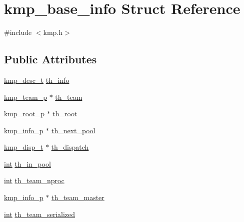 \hypertarget{structkmp__base__info}{\section{kmp\-\_\-base\-\_\-info Struct Reference}
\label{structkmp__base__info}
}


{\ttfamily \#include $<$kmp.\-h$>$}

\subsection*{Public Attributes}
\begin{DoxyCompactItemize}
\item 
\hyperlink{kmp_8h_a0b10af61096e1bac18cf4fc6acae5708}{kmp\-\_\-desc\-\_\-t} \hyperlink{structkmp__base__info_a922712159f3ad59ee5d79a182151f21b}{th\-\_\-info}
\item 
\hyperlink{kmp_8h_a2d72bf7a856130c6d2324db6367179a8}{kmp\-\_\-team\-\_\-p} $\ast$ \hyperlink{structkmp__base__info_a96385010dd060b2daec2310a7ddbe03e}{th\-\_\-team}
\item 
\hyperlink{kmp_8h_a511bcf1063f449060871e44de91e72f9}{kmp\-\_\-root\-\_\-p} $\ast$ \hyperlink{structkmp__base__info_ab24ae3c86062b1007b6403d0673f0401}{th\-\_\-root}
\item 
\hyperlink{kmp_8h_ac18028528c26006f57fea477167d447e}{kmp\-\_\-info\-\_\-p} $\ast$ \hyperlink{structkmp__base__info_a39a9989f4fd9476ef0868aeff1d5c003}{th\-\_\-next\-\_\-pool}
\item 
\hyperlink{kmp_8h_a125b055d611c51e55aa0b0819c1a5f33}{kmp\-\_\-disp\-\_\-t} $\ast$ \hyperlink{structkmp__base__info_a0b55c692c13be110491c23a0085f6730}{th\-\_\-dispatch}
\item 
\hyperlink{ittnotify__static_8h_a8b8dcd723308a8cb5d84277c7a3fff70}{int} \hyperlink{structkmp__base__info_abc2b3156a7154e8343a8784eeb505636}{th\-\_\-in\-\_\-pool}
\item 
\hyperlink{ittnotify__static_8h_a8b8dcd723308a8cb5d84277c7a3fff70}{int} \hyperlink{structkmp__base__info_acd206276ce1f5c2d3005b74d4631c45a}{th\-\_\-team\-\_\-nproc}
\item 
\hyperlink{kmp_8h_ac18028528c26006f57fea477167d447e}{kmp\-\_\-info\-\_\-p} $\ast$ \hyperlink{structkmp__base__info_afac55a0f7c6ea12c3d6a56290319ccb8}{th\-\_\-team\-\_\-master}
\item 
\hyperlink{ittnotify__static_8h_a8b8dcd723308a8cb5d84277c7a3fff70}{int} \hyperlink{structkmp__base__info_a11cf658fb603478c66c711453fcf2e28}{th\-\_\-team\-\_\-serialized}

\end{DoxyCompactItemize}
